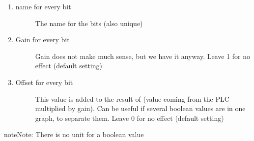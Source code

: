 \documentclass[a4paper,10pt,english]{sphinxmanual}
\begin{document}
\begin{enumerate}
%
\item {} \begin{description}
\item[{name for every bit}] \leavevmode
The name for the bits (also unique)

\end{description}

\item {} \begin{description}
\item[{Gain for every bit}] \leavevmode
Gain does not make much sense, but we have it anyway. Leave 1 for no effect (default setting)

\end{description}

\item {} \begin{description}
\item[{Offset for every bit}] \leavevmode
This value is added to the result of (value coming from the PLC multiplied by gain).
Can be useful if several boolean values are in one graph, to separate them.
Leave 0 for no effect (default setting)

\end{description}

\end{enumerate}

\begin{sphinxadmonition}{note}{Note:}
There is no unit for a boolean value
\end{sphinxadmonition}
\end{document}
